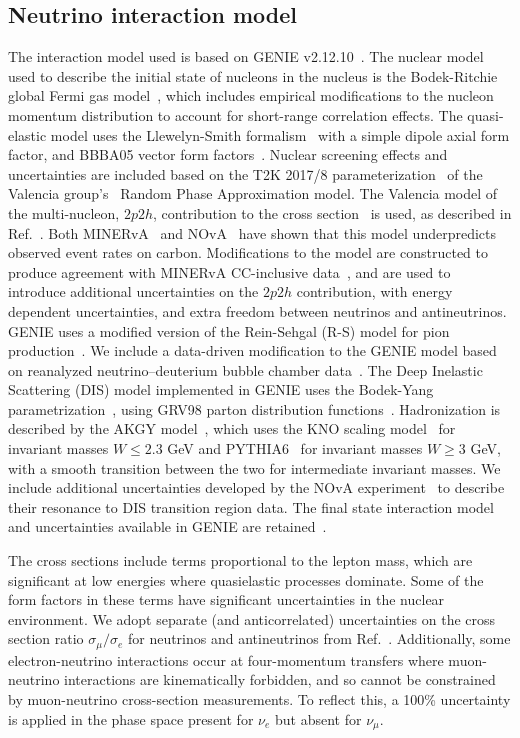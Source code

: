 \subsection{Neutrino interaction model}
The interaction model used is based on GENIE v2.12.10~\cite{Andreopoulos:2009rq,Andreopoulos:2015wxa}. The nuclear model used to describe the initial state of nucleons in the nucleus is the Bodek-Ritchie global Fermi gas model~\cite{BodekRitchie}, which includes empirical modifications to the nucleon momentum distribution to account for short-range correlation effects. The quasi-elastic model uses the Llewelyn-Smith formalism~\cite{llewelyn-smith} with a simple dipole axial form factor, and BBBA05 vector form factors~\cite{bbba05}. Nuclear screening effects and uncertainties are included based on the T2K 2017/8 parameterization~\cite{Abe:2018wpn} of the Valencia group's~\cite{nieves1,nieves2} Random Phase Approximation model. The Valencia model of the multi-nucleon, $2p2h$, contribution to the cross section~\cite{nieves1,nieves2} is used, as described in Ref.~\cite{Schwehr:2016pvn}. Both MINERvA~\cite{Rodrigues:2015hik} and NOvA~\cite{NOvA:2018gge} have shown that this model underpredicts observed event rates on carbon. Modifications to the model are constructed to produce agreement with MINERvA CC-inclusive data~\cite{Rodrigues:2015hik}, and are used to introduce additional uncertainties on the $2p2h$ contribution, with energy dependent uncertainties, and extra freedom between neutrinos and antineutrinos. GENIE uses a modified version of the Rein-Sehgal (R-S) model for pion production~\cite{Rein:1980wg}. We include a data-driven modification to the GENIE model based on reanalyzed neutrino--deuterium bubble chamber data~\cite{Wilkinson:2014yfa,Rodrigues:2016xjj}. The Deep Inelastic Scattering (DIS) model implemented in GENIE uses the Bodek-Yang parametrization~\cite{Bodek:2002ps}, using GRV98 parton distribution functions~\cite{Gluck:1998xa}. Hadronization is described by the AKGY model~\cite{Yang:2009zx}, which uses the KNO scaling model~\cite{Koba:1972ng} for invariant masses $W \leq 2.3$ GeV and PYTHIA6~\cite{Sjostrand:2006za} for invariant masses $W \geq 3$ GeV, with a smooth transition between the two for intermediate invariant masses. We include additional uncertainties developed by the NOvA experiment~\cite{nova_2018} to describe their resonance to DIS transition region data. The final state interaction model and uncertainties available in GENIE are retained~\cite{Dytman:2011zz,Dytman:2015taa,intranuke_2009}.

The cross sections include terms proportional to the lepton mass, which are significant at low energies where quasielastic processes dominate. Some of the form factors in these terms have significant uncertainties in the nuclear environment. We adopt separate (and anticorrelated) uncertainties on the cross section ratio $\sigma_\mu/\sigma_e$ for neutrinos and antineutrinos from Ref.~\cite{Day:2012gb}. Additionally, some electron-neutrino interactions occur at four-momentum transfers where muon-neutrino interactions are kinematically forbidden, and so cannot be constrained by muon-neutrino cross-section measurements. To reflect this, a 100\% uncertainty is applied in the phase space present for $\nu_e$ but absent for $\nu_\mu$.

